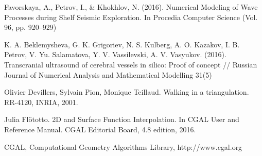 \documentclass[a4paper]{article}
\numberwithin{equation}{section}
\begin{document}
\begin{thebibliography}{99}
 Favorskaya, A., Petrov, I., \& Khokhlov, N. (2016). 
Numerical Modeling of Wave Processes during Shelf Seismic Exploration. 
In Procedia Computer Science (Vol. 96, pp. 920–929)

 K. A. Beklemysheva, G. K. Grigoriev, N. S. Kulberg, 
A. O. Kazakov, I. B. Petrov, V. Yu. Salamatova, Y. V. Vassilevski, A. V. Vasyukov. (2016).
Transcranial ultrasound of cerebral vessels in silico: Proof of concept 
// Russian Journal of Numerical Analysis and Mathematical Modelling 31(5)

 Olivier Devillers, Sylvain Pion, Monique Teillaud. 
Walking in a triangulation. RR-4120, INRIA, 2001.

 Julia Flötotto. 
2D and Surface Function Interpolation. 
In CGAL User and Reference Manual. CGAL Editorial Board, 4.8 edition, 2016.

 CGAL, Computational Geometry Algorithms Library, http://www.cgal.org

\end{thebibliography}
\end{document}
